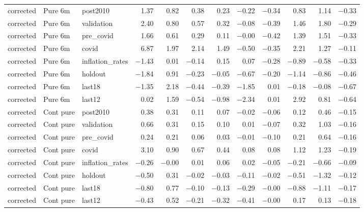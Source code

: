 \begin{tabular}{lllrrrrrrrrr}
corrected & Pure 6m & post2010 & 1.37 & 0.82 & 0.38 & 0.23 & $-$0.22 & $-$0.34 & 0.83 & 1.14 & $-$0.33 \\
corrected & Pure 6m & validation & 2.40 & 0.80 & 0.57 & 0.32 & $-$0.08 & $-$0.39 & 1.46 & 1.80 & $-$0.29 \\
corrected & Pure 6m & pre\_covid & 1.66 & 0.61 & 0.29 & 0.11 & $-$0.00 & $-$0.42 & 1.39 & 1.51 & $-$0.33 \\
corrected & Pure 6m & covid & 6.87 & 1.97 & 2.14 & 1.49 & $-$0.50 & $-$0.35 & 2.21 & 1.27 & $-$0.11 \\
corrected & Pure 6m & inflation\_rates & $-$1.43 & 0.01 & $-$0.14 & 0.15 & 0.07 & $-$0.28 & $-$0.89 & $-$0.58 & $-$0.33 \\
corrected & Pure 6m & holdout & $-$1.84 & 0.91 & $-$0.23 & $-$0.05 & $-$0.67 & $-$0.20 & $-$1.14 & $-$0.86 & $-$0.46 \\
corrected & Pure 6m & last18 & $-$1.35 & 2.18 & $-$0.44 & $-$0.39 & $-$1.85 & 0.01 & $-$0.18 & $-$0.08 & $-$0.67 \\
corrected & Pure 6m & last12 & 0.02 & 1.59 & $-$0.54 & $-$0.98 & $-$2.34 & 0.01 & 2.92 & 0.81 & $-$0.64 \\
corrected & Cont pure & post2010 & 0.38 & 0.31 & 0.11 & 0.07 & $-$0.02 & $-$0.06 & 0.12 & 0.46 & $-$0.15 \\
corrected & Cont pure & validation & 0.66 & 0.31 & 0.15 & 0.10 & 0.01 & $-$0.07 & 0.32 & 1.03 & $-$0.16 \\
corrected & Cont pure & pre\_covid & 0.24 & 0.21 & 0.06 & 0.03 & $-$0.01 & $-$0.10 & 0.21 & 0.64 & $-$0.16 \\
corrected & Cont pure & covid & 3.10 & 0.90 & 0.67 & 0.44 & 0.08 & 0.08 & 1.12 & 1.23 & $-$0.19 \\
corrected & Cont pure & inflation\_rates & $-$0.26 & $-$0.00 & 0.01 & 0.06 & 0.02 & $-$0.05 & $-$0.21 & $-$0.66 & $-$0.09 \\
corrected & Cont pure & holdout & $-$0.50 & 0.31 & $-$0.02 & $-$0.03 & $-$0.11 & $-$0.02 & $-$0.51 & $-$1.32 & $-$0.12 \\
corrected & Cont pure & last18 & $-$0.80 & 0.77 & $-$0.10 & $-$0.13 & $-$0.29 & $-$0.00 & $-$0.88 & $-$1.11 & $-$0.17 \\
corrected & Cont pure & last12 & $-$0.43 & 0.52 & $-$0.21 & $-$0.32 & $-$0.41 & $-$0.00 & 0.17 & 0.13 & $-$0.18 \\
\bottomrule
\end{tabular}
